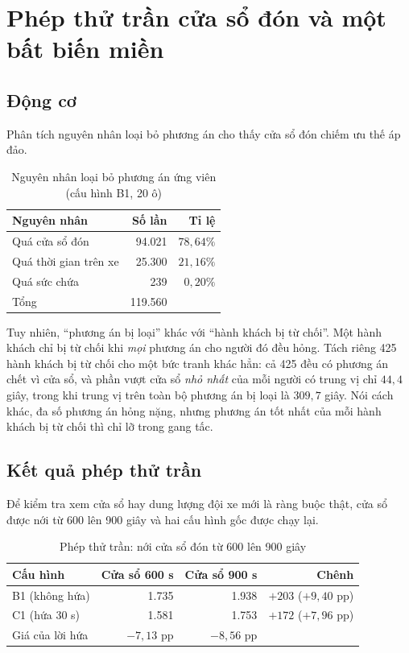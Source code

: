\section{Phép thử trần cửa sổ đón và một bất biến miền}
\label{muc:cuaso}

\subsection{Động cơ}

Phân tích nguyên nhân loại bỏ phương án cho thấy cửa sổ đón chiếm ưu thế áp đảo.

\begin{table}[htbp]
\centering
\caption{Nguyên nhân loại bỏ phương án ứng viên (cấu hình B1, 20 ô)}
\label{bang:nguyennhan}
\small
\begin{tabular}{@{}lrr@{}}
\toprule
\textbf{Nguyên nhân} & \textbf{Số lần} & \textbf{Tỉ lệ}\\
\midrule
Quá cửa sổ đón & 94.021 & $78{,}64\%$\\
Quá thời gian trên xe & 25.300 & $21{,}16\%$\\
Quá sức chứa & 239 & $0{,}20\%$\\
\midrule
Tổng & 119.560 & \\
\bottomrule
\end{tabular}
\end{table}

Tuy nhiên, ``phương án bị loại'' khác với ``hành khách bị từ chối''. Một hành khách chỉ bị từ
chối khi \emph{mọi} phương án cho người đó đều hỏng. Tách riêng 425 hành khách bị từ chối cho
một bức tranh khác hẳn: cả 425 đều có phương án chết vì cửa sổ, và phần vượt cửa sổ \emph{nhỏ
nhất} của mỗi người có trung vị chỉ $44{,}4$ giây, trong khi trung vị trên toàn bộ phương án bị
loại là $309{,}7$ giây. Nói cách khác, đa số phương án hỏng nặng, nhưng phương án tốt nhất của
mỗi hành khách bị từ chối thì chỉ lỡ trong gang tấc.

\subsection{Kết quả phép thử trần}

Để kiểm tra xem cửa sổ hay dung lượng đội xe mới là ràng buộc thật, cửa sổ được nới từ 600 lên
900 giây và hai cấu hình gốc được chạy lại.

\begin{table}[htbp]
\centering
\caption{Phép thử trần: nới cửa sổ đón từ 600 lên 900 giây}
\label{bang:tran}
\small
\begin{tabular}{@{}lrrr@{}}
\toprule
\textbf{Cấu hình} & \textbf{Cửa sổ 600 s} & \textbf{Cửa sổ 900 s} & \textbf{Chênh}\\
\midrule
B1 (không hứa) & 1.735 & 1.938 & $+203$ ($+9{,}40$ pp)\\
C1 (hứa 30 s) & 1.581 & 1.753 & $+172$ ($+7{,}96$ pp)\\
\midrule
Giá của lời hứa & $-7{,}13$ pp & $-8{,}56$ pp & \\
\bottomrule
\end{tabular}
\end{table}

